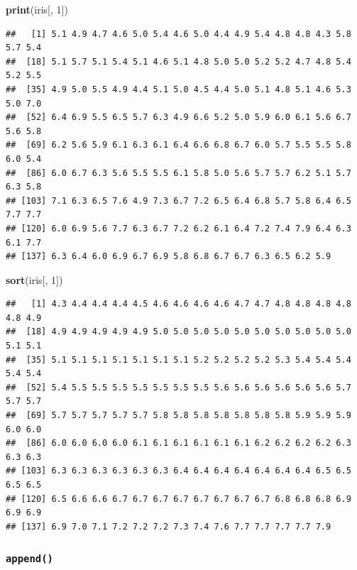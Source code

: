 \documentclass[]{book}
\newenvironment{Shaded}{\begin{snugshade}}{\end{snugshade}}
\newcommand{\KeywordTok}[1]{\textcolor[rgb]{0.13,0.29,0.53}{\textbf{#1}}}
\newcommand{\DecValTok}[1]{\textcolor[rgb]{0.00,0.00,0.81}{#1}}
\newcommand{\NormalTok}[1]{#1}
\begin{document}
\begin{Shaded}
\begin{Highlighting}[]
\KeywordTok{print}\NormalTok{(iris[, }\DecValTok{1}\NormalTok{])}
\end{Highlighting}
\end{Shaded}

\begin{verbatim}
##   [1] 5.1 4.9 4.7 4.6 5.0 5.4 4.6 5.0 4.4 4.9 5.4 4.8 4.8 4.3 5.8 5.7 5.4
##  [18] 5.1 5.7 5.1 5.4 5.1 4.6 5.1 4.8 5.0 5.0 5.2 5.2 4.7 4.8 5.4 5.2 5.5
##  [35] 4.9 5.0 5.5 4.9 4.4 5.1 5.0 4.5 4.4 5.0 5.1 4.8 5.1 4.6 5.3 5.0 7.0
##  [52] 6.4 6.9 5.5 6.5 5.7 6.3 4.9 6.6 5.2 5.0 5.9 6.0 6.1 5.6 6.7 5.6 5.8
##  [69] 6.2 5.6 5.9 6.1 6.3 6.1 6.4 6.6 6.8 6.7 6.0 5.7 5.5 5.5 5.8 6.0 5.4
##  [86] 6.0 6.7 6.3 5.6 5.5 5.5 6.1 5.8 5.0 5.6 5.7 5.7 6.2 5.1 5.7 6.3 5.8
## [103] 7.1 6.3 6.5 7.6 4.9 7.3 6.7 7.2 6.5 6.4 6.8 5.7 5.8 6.4 6.5 7.7 7.7
## [120] 6.0 6.9 5.6 7.7 6.3 6.7 7.2 6.2 6.1 6.4 7.2 7.4 7.9 6.4 6.3 6.1 7.7
## [137] 6.3 6.4 6.0 6.9 6.7 6.9 5.8 6.8 6.7 6.7 6.3 6.5 6.2 5.9
\end{verbatim}

\begin{Shaded}
\begin{Highlighting}[]
\KeywordTok{sort}\NormalTok{(iris[, }\DecValTok{1}\NormalTok{])}
\end{Highlighting}
\end{Shaded}

\begin{verbatim}
##   [1] 4.3 4.4 4.4 4.4 4.5 4.6 4.6 4.6 4.6 4.7 4.7 4.8 4.8 4.8 4.8 4.8 4.9
##  [18] 4.9 4.9 4.9 4.9 4.9 5.0 5.0 5.0 5.0 5.0 5.0 5.0 5.0 5.0 5.0 5.1 5.1
##  [35] 5.1 5.1 5.1 5.1 5.1 5.1 5.1 5.2 5.2 5.2 5.2 5.3 5.4 5.4 5.4 5.4 5.4
##  [52] 5.4 5.5 5.5 5.5 5.5 5.5 5.5 5.5 5.6 5.6 5.6 5.6 5.6 5.6 5.7 5.7 5.7
##  [69] 5.7 5.7 5.7 5.7 5.7 5.8 5.8 5.8 5.8 5.8 5.8 5.8 5.9 5.9 5.9 6.0 6.0
##  [86] 6.0 6.0 6.0 6.0 6.1 6.1 6.1 6.1 6.1 6.1 6.2 6.2 6.2 6.2 6.3 6.3 6.3
## [103] 6.3 6.3 6.3 6.3 6.3 6.3 6.4 6.4 6.4 6.4 6.4 6.4 6.4 6.5 6.5 6.5 6.5
## [120] 6.5 6.6 6.6 6.7 6.7 6.7 6.7 6.7 6.7 6.7 6.7 6.8 6.8 6.8 6.9 6.9 6.9
## [137] 6.9 7.0 7.1 7.2 7.2 7.2 7.3 7.4 7.6 7.7 7.7 7.7 7.7 7.9
\end{verbatim}

\subsubsection{\texorpdfstring{\texttt{append()}}{append()}}\label{l015append}
\end{document}
